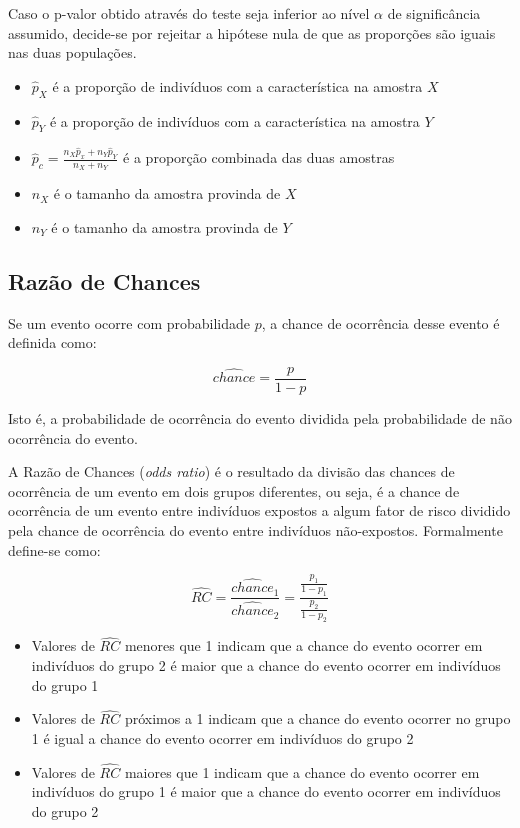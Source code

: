 \documentclass[
]{estat/estat}
\providecommand{\tightlist}{%
  \setlength{\itemsep}{0pt}\setlength{\parskip}{0pt}}\usepackage{longtable,booktabs,array}
\begin{document}
Caso o p-valor obtido através do teste seja inferior ao nível \(\alpha\)
de significância assumido, decide-se por rejeitar a hipótese nula de que
as proporções são iguais nas duas populações.

\begin{itemize}
\tightlist
\item
  \(\hat{p}_X\) é a proporção de indivíduos com a característica na
  amostra \(X\)
\item
  \(\hat{p}_Y\) é a proporção de indivíduos com a característica na
  amostra \(Y\)
\item
  \(\hat{p}_c=\frac{n_X\hat{p}_x+n_Y\hat{p}_Y}{n_X+n_Y}\) é a proporção
  combinada das duas amostras
\item
  \(n_X\) é o tamanho da amostra provinda de \(X\)
\item
  \(n_Y\) é o tamanho da amostra provinda de \(Y\)
\end{itemize}

\subsection{Razão de Chances}\label{razuxe3o-de-chances}

Se um evento ocorre com probabilidade \(p\), a chance de ocorrência
desse evento é definida como:

\[\hat{chance}=\frac{p}{1-p}\]

Isto é, a probabilidade de ocorrência do evento dividida pela
probabilidade de não ocorrência do evento.

A Razão de Chances (\textit{odds ratio}) é o resultado da divisão das
chances de ocorrência de um evento em dois grupos diferentes, ou seja, é
a chance de ocorrência de um evento entre indivíduos expostos a algum
fator de risco dividido pela chance de ocorrência do evento entre
indivíduos não-expostos. Formalmente define-se como:

\[\hat{RC}=\frac{\hat{chance}_1}{\hat{chance}_2}=\frac{\frac{p_1}{1-p_1}}{\frac{p_2}{1-p_2}}\]

\begin{itemize}
\item
  Valores de \(\hat{RC}\) menores que 1 indicam que a chance do evento
  ocorrer em indivíduos do grupo 2 é maior que a chance do evento
  ocorrer em indivíduos do grupo 1
\item
  Valores de \(\hat{RC}\) próximos a 1 indicam que a chance do evento
  ocorrer no grupo 1 é igual a chance do evento ocorrer em indivíduos do
  grupo 2
\item
  Valores de \(\hat{RC}\) maiores que 1 indicam que a chance do evento
  ocorrer em indivíduos do grupo 1 é maior que a chance do evento
  ocorrer em indivíduos do grupo 2
\end{itemize}
\end{document}
